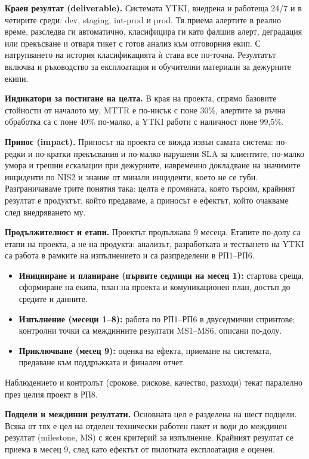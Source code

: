 \documentclass[11pt,a4paper]{article}
\begin{document}
\textbf{Краен резултат (deliverable).} Системата YTKI, внедрена и работеща 24/7 и в четирите среди: dev, staging, int-prod и prod. Тя приема алертите в реално време, разследва ги автоматично, класифицира ги като фалшив алерт, деградация или прекъсване и отваря тикет с готов анализ към отговорния екип. С натрупването на история класификацията ѝ става все по-точна. Резултатът включва и ръководство за експлоатация и обучителни материали за дежурните екипи.

\textbf{Индикатори за постигане на целта.} В края на проекта, спрямо базовите стойности от началото му, MTTR е по-нисък с поне 30\%, алертите за ръчна обработка са с поне 40\% по-малко, а YTKI работи с наличност поне 99,5\%.

\textbf{Принос (impact).} Приносът на проекта се вижда извън самата система: по-редки и по-кратки прекъсвания и по-малко нарушени SLA за клиентите, по-малко умора и грешни ескалации при дежурните, навременно докладване на значимите инциденти по NIS2 и знание от минали инциденти, което не се губи. Разграничаваме трите понятия така: целта е промяната, която търсим, крайният резултат е продуктът, който предаваме, а приносът е ефектът, който очакваме след внедряването му.

\textbf{Продължителност и етапи.} Проектът продължава 9 месеца. Етапите по-долу са етапи на проекта, а не на продукта: анализът, разработката и тестването на YTKI са работа в рамките на изпълнението и са разпределени в РП1--РП6.
\begin{itemize}
  \item \textbf{Иницииране и планиране (първите седмици на месец 1):} стартова среща, сформиране на екипа, план на проекта и комуникационен план, достъп до средите и данните.
  \item \textbf{Изпълнение (месеци 1--8):} работа по РП1--РП6 в двуседмични спринтове; контролни точки са междинните резултати MS1--MS6, описани по-долу.
  \item \textbf{Приключване (месец 9):} оценка на ефекта, приемане на системата, предаване към поддръжката и финален отчет.
\end{itemize}
Наблюдението и контролът (срокове, рискове, качество, разходи) текат паралелно през целия проект в РП8.

\textbf{Подцели и междинни резултати.} Основната цел е разделена на шест подцели. Всяка от тях е цел на отделен технически работен пакет и води до междинен резултат (milestone, MS) с ясен критерий за изпълнение. Крайният резултат се приема в месец 9, след като ефектът от пилотната експлоатация е оценен.
\end{document}
